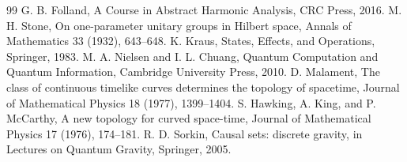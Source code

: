 \documentclass[11pt,a4paper]{article}
\begin{document}
\begin{thebibliography}{99}
 G. B. Folland, A Course in Abstract Harmonic Analysis, CRC Press, 2016.
 M. H. Stone, On one-parameter unitary groups in Hilbert space, Annals of Mathematics 33 (1932), 643--648.
 K. Kraus, States, Effects, and Operations, Springer, 1983.
 M. A. Nielsen and I. L. Chuang, Quantum Computation and Quantum Information, Cambridge University Press, 2010.
 D. Malament, The class of continuous timelike curves determines the topology of spacetime, Journal of Mathematical Physics 18 (1977), 1399--1404.
 S. Hawking, A. King, and P. McCarthy, A new topology for curved space-time, Journal of Mathematical Physics 17 (1976), 174--181.
 R. D. Sorkin, Causal sets: discrete gravity, in Lectures on Quantum Gravity, Springer, 2005.
\end{thebibliography}
\end{document}
